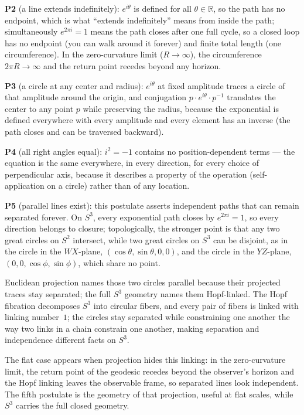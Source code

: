 \documentclass[12pt]{article}
\begin{document}
\textbf{P2} (a line extends indefinitely): $e^{i\theta}$ is defined for all $\theta \in \mathbb{R}$, so the path has no endpoint, which is what ``extends indefinitely'' means from inside the path; simultaneously $e^{2\pi i} = 1$ means the path closes after one full cycle, so a closed loop has no endpoint (you can walk around it forever) and finite total length (one circumference). In the zero-curvature limit ($R \to \infty$), the circumference $2\pi R \to \infty$ and the return point recedes beyond any horizon.

\textbf{P3} (a circle at any center and radius): $e^{i\theta}$ at fixed amplitude traces a circle of that amplitude around the origin, and conjugation $p \cdot e^{i\theta} \cdot p^{-1}$ translates the center to any point $p$ while preserving the radius, because the exponential is defined everywhere with every amplitude and every element has an inverse (the path closes and can be traversed backward).

\textbf{P4} (all right angles equal): $i^2 = -1$ contains no position-dependent terms --- the equation is the same everywhere, in every direction, for every choice of perpendicular axis, because it describes a property of the operation (self-application on a circle) rather than of any location.

\textbf{P5} (parallel lines exist): this postulate asserts independent paths that can remain separated forever. On $S^3$, every exponential path closes by $e^{2\pi i}=1$, so every direction belongs to closure; topologically, the stronger point is that any two great circles on $S^2$ intersect, while two great circles on $S^3$ can be disjoint, as in the circle in the $WX$-plane, $(\cos\theta,\sin\theta,0,0)$, and the circle in the $YZ$-plane, $(0,0,\cos\phi,\sin\phi)$, which share no point.

Euclidean projection names those two circles parallel because their projected traces stay separated; the full $S^3$ geometry names them Hopf-linked. The Hopf fibration decomposes $S^3$ into circular fibers, and every pair of fibers is linked with linking number~$1$; the circles stay separated while constraining one another the way two links in a chain constrain one another, making separation and independence different facts on $S^3$.

The flat case appears when projection hides this linking: in the zero-curvature limit, the return point of the geodesic recedes beyond the observer's horizon and the Hopf linking leaves the observable frame, so separated lines look independent. The fifth postulate is the geometry of that projection, useful at flat scales, while $S^3$ carries the full closed geometry.
\end{document}
